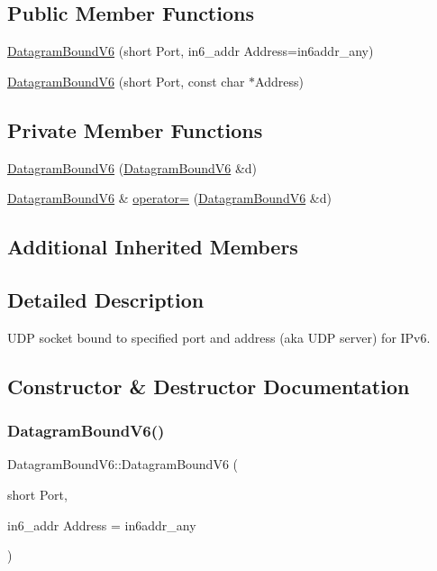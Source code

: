 \subsection*{Public Member Functions}
\begin{DoxyCompactItemize}
\item 
\hyperlink{classDatagramBoundV6_a2ea297627599924828a2ba5f3841f5b6}{Datagram\+Bound\+V6} (short Port, in6\+\_\+addr Address=in6addr\+\_\+any)
\item 
\hyperlink{classDatagramBoundV6_a10466ff587a48113bafaedfd6fe7b0be}{Datagram\+Bound\+V6} (short Port, const char $\ast$Address)
\end{DoxyCompactItemize}
\subsection*{Private Member Functions}
\begin{DoxyCompactItemize}
\item 
\hyperlink{classDatagramBoundV6_ac392602b5e9fa32a4ef137e97ddc0842}{Datagram\+Bound\+V6} (\hyperlink{classDatagramBoundV6}{Datagram\+Bound\+V6} \&d)
\item 
\hyperlink{classDatagramBoundV6}{Datagram\+Bound\+V6} \& \hyperlink{classDatagramBoundV6_ad4e4d9bf21708ecb03786df5230bd769}{operator=} (\hyperlink{classDatagramBoundV6}{Datagram\+Bound\+V6} \&d)
\end{DoxyCompactItemize}
\subsection*{Additional Inherited Members}


\subsection{Detailed Description}
U\+DP socket bound to specified port and address (aka U\+DP server) for I\+Pv6. 

\subsection{Constructor \& Destructor Documentation}
\mbox{\label{classDatagramBoundV6_a2ea297627599924828a2ba5f3841f5b6}} 
\subsubsection{\texorpdfstring{Datagram\+Bound\+V6()}{DatagramBoundV6()}\hspace{0.1cm}{\footnotesize\ttfamily [1/3]}}
{\footnotesize\ttfamily Datagram\+Bound\+V6\+::\+Datagram\+Bound\+V6 (\begin{DoxyParamCaption}\item[{short}]{Port,  }\item[{in6\+\_\+addr}]{Address = {\ttfamily in6addr\+\_\+any} }\end{DoxyParamCaption})}

